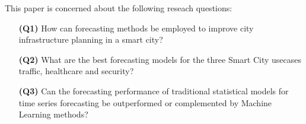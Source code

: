 This paper is concerned about the following reseach questions:

\begin{enumerate}
\item[\textbf{(Q1)}] How can forecasting methods be employed to improve city infrastructure planning in a smart city?
\item[\textbf{(Q2)}] What are the best forecasting models for the three Smart City usecases traffic, healthcare and security?
\item[\textbf{(Q3)}] Can the forecasting performance of traditional statistical models for time series forecasting be outperformed or complemented by Machine Learning methods?
\end{enumerate}